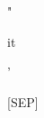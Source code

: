 \documentclass[varwidth=150mm]{standalone}
\begin{document}
\begin{CJK*}{UTF8}{gbsn}
{{{\colorbox{red!43.23822021484375}{\strut "} \colorbox{red!15.403362274169922}{\strut it} \colorbox{red!4.749843120574951}{\strut '} \colorbox{red!4.234325408935547}{\strut [SEP]}
}}}
\end{CJK*}
\end{document}
